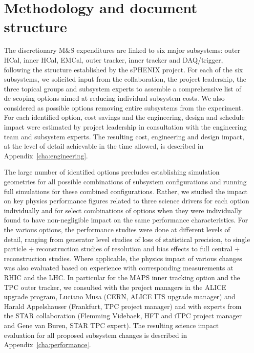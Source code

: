\section{Methodology and document structure}

The discretionary M\&S expenditures are linked to six major
subsystems: outer HCal, inner HCal, EMCal, outer tracker, inner
tracker and DAQ/trigger, following the structure established by the
sPHENIX project. For each of the six subsystems, we solicited input
from the collaboration, the project leadership, the three topical
groups and subsystem experts to assemble a comprehensive list of
de-scoping options aimed at reducing individual subsystem costs.  We
also considered as possible options removing entire subsystems from
the experiment. For each identified option, cost savings and the
engineering, design and schedule impact were estimated by project
leadership in consultation with the engineering team and subsystem
experts. The resulting cost, engineering and design impact, at the
level of detail achievable in the time allowed, is described in
Appendix~\ref{cha:engineering}.

The large number of identified options precludes establishing
simulation geometries for all possible combinations of subsystem
configurations and running full \geant simulations for these combined
configurations. Rather, we studied the impact on key physics
performance figures related to three science drivers for each option
individually and for select combinations of options when they were
individually found to have non-negligible impact on the same
performance characteristics. For the various options, the performance
studies were done at different levels of detail, ranging from
generator level studies of loss of statistical precision, to single
particle \geant + reconstruction studies of resolution and bias
effects to full central \auau \hijing \geant + reconstruction
studies. Where applicable, the physics impact of various changes was
also evaluated based on experience with corresponding measurements at
RHIC and the LHC. In particular for the MAPS inner tracking option and
the TPC outer tracker, we consulted with the project managers in the
ALICE upgrade program, Luciano Musa (CERN, ALICE ITS upgrade manager)
and Harald Appelshauser (Frankfurt, TPC project manager) and with
experts from the STAR collaboration (Flemming Videbaek, HFT and iTPC
project manager and Gene van Buren, STAR TPC expert). The resulting
science impact evaluation for all proposed subsystem changes is
described in Appendix~\ref{cha:performance}.


